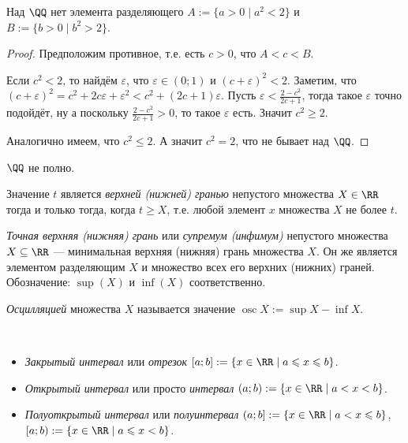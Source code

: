 \documentclass[12pt,a4paper]{article}
\DeclareMathOperator*{\osc}{osc}
\begin{document}
    \begin{statement*}
        Над $\QQ$ нет  элемента разделяющего $A := \{a > 0 \mid a^2 < 2\}$ и $B := \{b > 0 \mid b^2 > 2\}$.
    \end{statement*}

    \begin{proof}
        Предположим противное, т.е. есть $c > 0$, что $A < c < B$.

        Если $c^2 < 2$, то найдём $\varepsilon$, что $\varepsilon \in (0; 1)$ и $(c + \varepsilon)^2 < 2$. Заметим, что $(c + \varepsilon)^2 = c^2 + 2c\varepsilon + \varepsilon^2 < c^2 + (2c + 1)\varepsilon$. Пусть $\varepsilon < \frac{2 - c^2}{2c+ 1}$, тогда такое $\varepsilon$ точно подойдёт, ну а поскольку $\frac{2 - c^2}{2c + 1} > 0$, то такое $\varepsilon$ есть. Значит $c^2 \geqslant 2$.
        
        Аналогично имеем, что $c^2 \leqslant 2$. А значит $c^2 = 2$, что не бывает над $\QQ$.
    \end{proof}

    \begin{corollary*}
        $\QQ$ не полно.
    \end{corollary*}
    
    \begin{definition}
        Значение $t$ является \emph{верхней (нижней) гранью} непустого множества $X \in \RR$ тогда и только тогда, когда $t \geqslant X$, т.е. любой элемент $x$ множества $X$ не более $t$.
        
        
        \emph{Точная верхняя (нижняя) грань} или \emph{супремум (инфимум)} непустого множества $X \subseteq \RR$ --- минимальная верхняя (нижняя) грань множества $X$. Он же является элементом разделяющим $X$ и множество всех его верхних (нижних) граней. Обозначение: $\sup(X)$ и $\inf(X)$ соответственно.

        \emph{Осцилляцией} множества $X$ называется значение $\osc X := \sup X - \inf X$.
    \end{definition}

    \begin{definition}\ 
        \begin{itemize}
            \item \emph{Закрытый интервал} или \emph{отрезок} $[a;b]:=\{x\in\RR \mid a \leqslant x \leqslant b\}$.
            \item \emph{Открытый интервал} или просто \emph{интервал} $(a;b):=\{x\in\RR \mid a < x < b\}$.
            \item \emph{Полуоткрытый интервал} или \emph{полуинтервал} $(a;b] := \{x\in\RR \mid a < x \leqslant b\}$, $[a;b):=\{x\in\RR \mid a \leqslant x < b\}$.
        \end{itemize}
    \end{definition}
\end{document}
